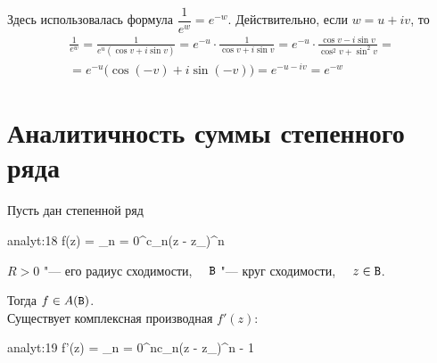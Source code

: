 \begin{exmpls}
	Здесь использовалась формула $ \dfrac1{e^w} = e^{-w} $. Действительно, если $ w = u + iv $, то
	\begin{multline*}
		\frac1{e^w} = \frac1{e^u(\cos v + i\sin v)} = e^{-u} \cdot \frac1{\cos v + i \sin v} = e^{-u} \cdot \frac{\cos v - i \sin v}{\cos^2 v + \sin^2 v} = \\
		= e^{-u} \big(\cos (-v) + i \sin (-v) \big) = e^{-u - iv} = e^{-w}
	\end{multline*}
\end{exmpls}

\section{Аналитичность суммы степенного ряда}

\begin{theorem}
	Пусть дан степенной ряд
	\begin{equ}{analyt:18}
		f(z) = \sum_{n = 0}^\infty c_n(z - z_\circ)^n
	\end{equ}
	$ R > 0 $ "--- его радиус сходимости, $ \quad \mathtt{B} $ "--- круг сходимости, $ \quad z \in \mathtt{B} $.

	Тогда $ f \in A(\mathtt{B}) $. \\
	Существует комплексная производная $ f'(z) $:
	\begin{equ}{analyt:19}
		f'(z) = \sum_{n = 0}^\infty nc_n(z - z_\circ)^{n - 1}
	\end{equ}
\end{theorem}

